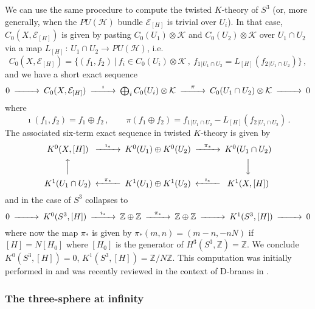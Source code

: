 \documentclass[a4paper,reqno]{amsart}
\theoremstyle{plain}
\theoremstyle{definition}
\theoremstyle{remark}
\numberwithin{equation}{section}
\numberwithin{figure}{section}
\newcommand{\cH}{{\mathcal H}}
\newcommand{\cE}{{\mathcal E}}
\newcommand{\cK}{{\mathcal K}}
\newcommand{\ZZ}{{\mathbb Z}}
\newcommand{\<}{\langle}
\renewcommand{\>}{\rangle}
\begin{document}
We can use the same procedure to compute the twisted $K$-theory of
$S^3$ (or, more generally, when
the $PU(\cH)$ bundle $\cE_{[H]}$ is trivial over $U_i$).
In that case, $C_0(X,\cE_{[H]})$ is given by pasting
$C_0(U_1)\otimes \cK$ and $C_0(U_2)\otimes \cK$ over
$U_1\cap U_2$ via a map $L_{[H]}\,:\,U_1\cap U_2\to PU(\cH)$, i.e.\
$$
C_0(X,\cE_{[H]})  = \{ (f_1,f_2)\ | \ f_i\in C_0(U_i)\otimes \cK\,,\
       f_1{}_{\lvert U_1\cap U_2} = L_{[H]} (f_2{}_{\lvert U_1\cap U_2} )
        \}  \,,
$$
and we have a short exact sequence
$$
\begin{CD}
0 @>>> C_0(X,\cE_{[H]}) @>\imath>> \bigoplus_i C_0(U_i)\otimes \cK
@>\pi>> C_0(U_1\cap U_2) \otimes \cK @>>> 0
\end{CD}
$$
where
$$
\imath(f_1,f_2) = f_1\oplus f_2 \,,\qquad
\pi(f_1\oplus f_2) = f_1{}_{\lvert U_1\cap U_2} -
        L_{[H]} (f_2{}_{\lvert U_1\cap U_2} ) \,.
$$
The associated six-term exact sequence in twisted $K$-theory
is given by \cite{Rosa}
\begin{equation}
\begin{CD}
K^0(X,[H]) @>\imath_*>> K^0(U_1)\oplus K^0(U_2) @>\pi_*>>
        K^0(U_1\cap U_2) \\
@AAA      && @VVV \\
K^1(U_1\cap U_2) @<\pi_*<< K^1(U_1)\oplus K^1(U_2) @<\imath_*<<
         K^1(X,[H])
\end{CD}
\end{equation}
and in the case of $S^3$ collapses to
\begin{equation}
\begin{CD}
0 @>>> K^0(S^3,[H]) @>\imath_*>> \ZZ \oplus \ZZ @>\pi_*>> \ZZ \oplus \ZZ
@>>> K^1(S^3,[H]) @>>> 0
\end{CD}
\end{equation}
where now the map $\pi_*$ is given by $\pi_*(m,n)=(m-n,-nN)$
if $[H]=N[H_0]$ where $[H_0]$ is the generator of $H^3(S^3,\ZZ)=\ZZ$.
We conclude $K^0(S^3,[H])=0$, $K^1(S^3,[H])=\ZZ/N\ZZ$.
This computation was initially performed in \cite{Rosa} and was
recently reviewed in the context of D-branes in \cite{Maly}.

\subsubsection{The three-sphere at infinity}
\end{document}

